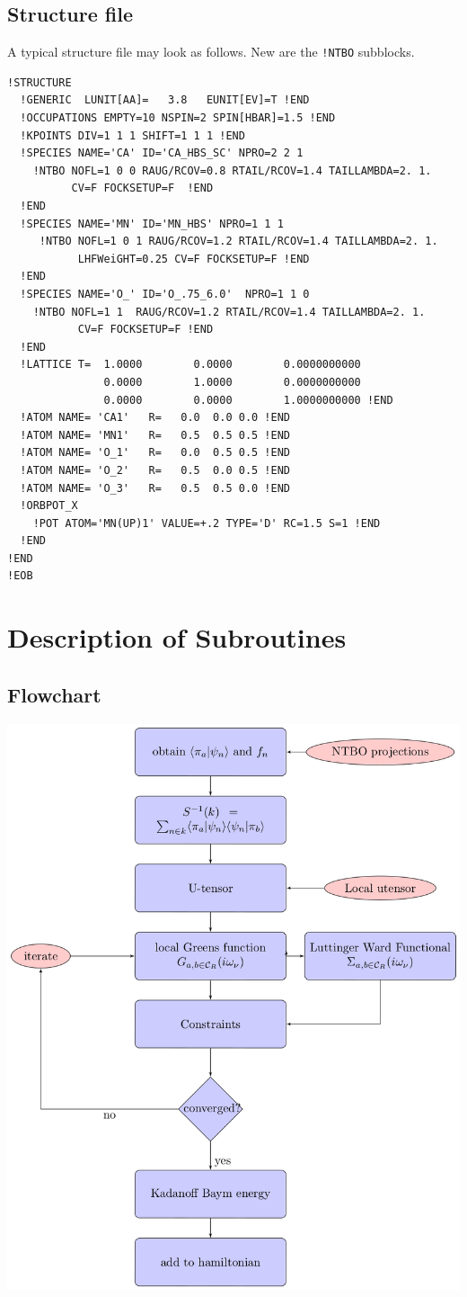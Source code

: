 \documentclass[11pt,a4paper]{report}
\begin{document}
\subsection{Structure file}
A typical structure file may look as follows. New are the \verb|!NTBO|
subblocks.
\begin{verbatim}
!STRUCTURE 
  !GENERIC  LUNIT[AA]=   3.8   EUNIT[EV]=T !END
  !OCCUPATIONS EMPTY=10 NSPIN=2 SPIN[HBAR]=1.5 !END
  !KPOINTS DIV=1 1 1 SHIFT=1 1 1 !END
  !SPECIES NAME='CA' ID='CA_HBS_SC' NPRO=2 2 1 
    !NTBO NOFL=1 0 0 RAUG/RCOV=0.8 RTAIL/RCOV=1.4 TAILLAMBDA=2. 1.
          CV=F FOCKSETUP=F  !END 
  !END
  !SPECIES NAME='MN' ID='MN_HBS' NPRO=1 1 1 
     !NTBO NOFL=1 0 1 RAUG/RCOV=1.2 RTAIL/RCOV=1.4 TAILLAMBDA=2. 1.
           LHFWeiGHT=0.25 CV=F FOCKSETUP=F !END 
  !END
  !SPECIES NAME='O_' ID='O_.75_6.0'  NPRO=1 1 0
    !NTBO NOFL=1 1  RAUG/RCOV=1.2 RTAIL/RCOV=1.4 TAILLAMBDA=2. 1.
           CV=F FOCKSETUP=F !END 
  !END
  !LATTICE T=  1.0000        0.0000        0.0000000000
               0.0000        1.0000        0.0000000000
               0.0000        0.0000        1.0000000000 !END
  !ATOM NAME= 'CA1'   R=   0.0  0.0 0.0 !END
  !ATOM NAME= 'MN1'   R=   0.5  0.5 0.5 !END
  !ATOM NAME= 'O_1'   R=   0.0  0.5 0.5 !END
  !ATOM NAME= 'O_2'   R=   0.5  0.0 0.5 !END
  !ATOM NAME= 'O_3'   R=   0.5  0.5 0.0 !END
  !ORBPOT_X
    !POT ATOM='MN(UP)1' VALUE=+.2 TYPE='D' RC=1.5 S=1 !END
  !END
!END 
!EOB
\end{verbatim}



\section{Description of Subroutines}

\subsection{Flowchart}
\begin{center}
\includegraphics[width=0.5\linewidth]
{Figs/TikZ/FlowdiagramDMFTinterface/flow.eps}
\end{center}
\end{document}
